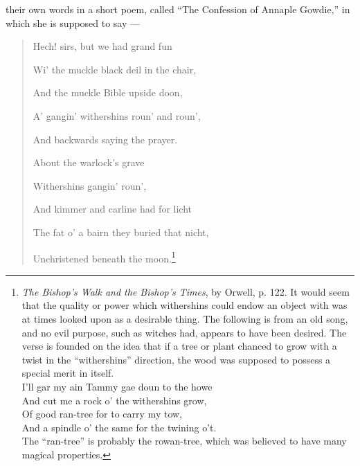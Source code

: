 \documentclass[a4paper, 11pt, oneside, polutonikogreek, english]{article}
\begin{document}
their own words in a short poem, called ``The Confession of Annaple Gowdie,'' in which she is supposed to say ---

\begin{quotation}\small
Hech! sirs, but we had grand fun

\hspace*{5mm}Wi' the muckle black deil in the chair,

And the muckle Bible upside doon,

A' gangin' withershins roun' and roun',

\hspace*{5mm}And backwards saying the prayer.

\bigskip

About the warlock's grave

\hspace*{5mm}Withershins gangin' roun',

And kimmer and carline had for licht

The fat o' a bairn they buried that nicht,

\hspace*{5mm}Unchristened beneath the moon.\footnote{\emph{The Bishop's Walk and the Bishop's Times}, by Orwell, p. 122. It would seem that the quality or power which withershins could endow an object with was at times looked upon as a desirable thing. The following is from an old song, and no evil purpose, such as witches had, appears to have been desired. The verse is founded on the idea that if a tree or plant chanced to grow with a twist in the ``withershins'' direction, the wood was supposed to possess a special merit in itself.\\\hspace*{10mm}I'll gar my ain Tammy gae doun to the howe\\\hspace*{10mm}And cut me a rock o' the withershins grow,\\\hspace*{10mm}Of good ran-tree for to carry my tow,\\\hspace*{15mm}And a spindle o' the same for the twining o't.\\\hspace*{10mm}The ``ran-tree'' is probably the rowan-tree, which was believed to have many magical properties.}
\end{quotation}
\end{document}
